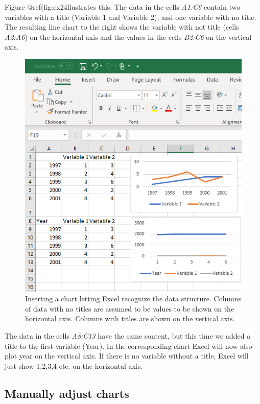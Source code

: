 \documentclass[]{book}
\begin{document}
Figure @ref(fig:ex24llustrates this. The data in the cells \emph{A1:C6} contain two variables with a title (Variable 1 and Variable 2), and one variable with no title. The resulting line chart to the right shows the variable with not title (cells \emph{A2:A6}) on the horizontal axis and the values in the cells \emph{B2:C6} on the vertical axis.

\begin{figure}

{\centering \includegraphics[width=0.75\linewidth]{_resources/chapter_excelbasic/g1} 

}

\caption{Inserting a chart letting  Excel recognize the data structure. Columns of data with no titles are assumed to be values to be shown on the horizontal axis. Columns with titles are shown on the vertical axis.}\label{fig:ex24}
\end{figure}

The data in the cells \emph{A8:C13} have the same content, but this time we added a title to the first variable (Year). In the corresponding chart Excel will now also plot year on the vertical axis. If there is no variable without a title, Excel will just show 1,2,3,4 etc. on the horizontal axis.

\hypertarget{manually-adjust-charts}{%
\subsection{Manually adjust charts}\label{manually-adjust-charts}}
\end{document}

